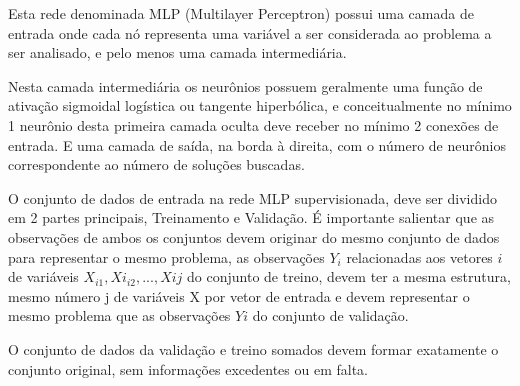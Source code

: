   	       \begin{figure}[H]
  	       \end{figure}
         
  	       Esta rede denominada MLP (Multilayer Perceptron) possui uma camada de entrada onde cada nó representa uma variável a ser considerada ao problema a ser analisado, e pelo menos uma camada intermediária.
  	      
  	       Nesta camada intermediária os neurônios possuem geralmente uma função de ativação sigmoidal logística ou tangente hiperbólica, e conceitualmente no mínimo 1 neurônio desta primeira camada oculta deve receber no mínimo 2 conexões de entrada. E uma camada de saída, na borda à direita, com o número de neurônios correspondente ao número de soluções buscadas. 
  	       
            	O conjunto de dados de entrada na rede MLP supervisionada, deve ser dividido em 2 partes principais, Treinamento e Validação. É importante salientar que as observações de ambos os conjuntos devem originar do mesmo conjunto de dados para representar o mesmo problema, as observações $Y_i$ relacionadas aos vetores $i$ de variáveis $X_{i1},Xi_{i2},...,X{ij}$ do conjunto de treino, devem ter a mesma estrutura, mesmo número j de variáveis X por vetor de entrada e devem representar o mesmo problema que as observações $Yi$ do conjunto de validação.
            	
            	O conjunto de dados da validação e treino somados devem formar exatamente o conjunto original, sem informações excedentes ou em falta.
            	
